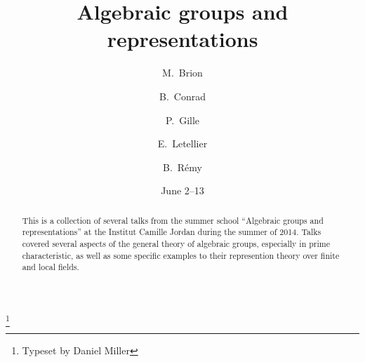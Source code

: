 \documentclass[english,letterpaper]{smfart}
\author{M.~Brion}
\author{B.~Conrad}
\author{P.~Gille}
\author{E.~Letellier}
\author{B.~R\'emy}
\title[Algebraic groups]{Algebraic groups and representations}
\date{June 2--13}
\begin{document}
\frontmatter

\begin{abstract}
This is a collection of several talks from the summer school ``Algebraic 
groups and representations'' at the Institut Camille Jordan during the 
summer of 2014.
Talks covered several aspects of the general theory of algebraic groups, especially 
in prime characteristic, as well 
as some specific examples to their represention theory over finite and local 
fields. 
\end{abstract}

\thanks{Typeset by Daniel Miller}

\maketitle
\tableofcontents
\mainmatter














\backmatter


\end{document}

